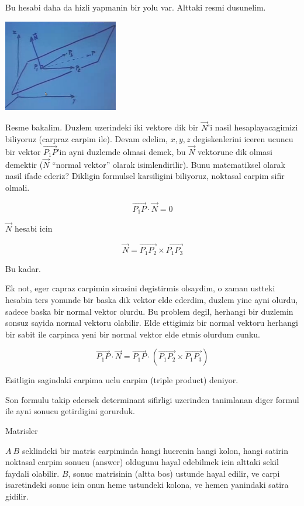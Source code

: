 \documentclass[12pt,fleqn]{article}\usepackage{../common}
\begin{document}
Bu hesabi daha da hizli yapmanin bir yolu var. Alttaki resmi dusunelim. 

\includegraphics[height=4cm]{3_3.png}

Resme bakalim. Duzlem uzerindeki iki vektore dik bir $\vec{N}$'i nasil
hesaplayacagimizi biliyoruz (carpraz carpim ile). Devam edelim, $x,y,z$
degiskenlerini iceren ucuncu bir vektor $\vec{P_1P}$'in ayni duzlemde
olmasi demek, bu $\vec{N}$ vektorune dik olmasi demektir ($\vec{N}$
``normal vektor'' olarak isimlendirilir). Bunu matematiksel olarak nasil
ifade ederiz? Dikligin formulsel karsiligini biliyoruz, noktasal carpim
sifir olmali.

\[ \vec{P_1P} \cdot \vec{N} = 0 \]

$\vec{N}$ hesabi icin 

\[ \vec{N} = \vec{P_1P_2} \times \vec{P_1P_3}\]

Bu kadar. 

Ek not, eger capraz carpimin sirasini degistirmis olsaydim, o zaman ustteki
hesabin ters yonunde bir baska dik vektor elde ederdim, duzlem yine ayni
olurdu, sadece baska bir normal vektor olurdu. Bu problem degil, herhangi
bir duzlemin sonsuz sayida normal vektoru olabilir. Elde ettigimiz bir
normal vektoru herhangi bir sabit ile carpinca yeni bir normal vektor elde
etmis olurdum cunku. 

\[ \vec{P_1P} \cdot \vec{N} = 
\vec{P_1P} \cdot (\vec{P_1P_2} \times \vec{P_1P_3})
\]

Esitligin sagindaki carpima uclu carpim (triple product) deniyor. 

Son formulu takip edersek determinant sifirligi uzerinden tanimlanan diger
formul ile ayni sonucu getirdigini gorurduk. 

Matrisler

$A \ B$ seklindeki bir matris carpiminda hangi hucrenin hangi kolon, hangi
satirin noktasal carpim sonucu (answer) oldugunu hayal edebilmek icin
alttaki sekil faydali olabilir. $B$, sonuc matrisinin (altta bos) ustunde
hayal edilir, ve carpi isaretindeki sonuc icin onun heme ustundeki kolona,
ve hemen yanindaki satira gidilir.
\end{document}
